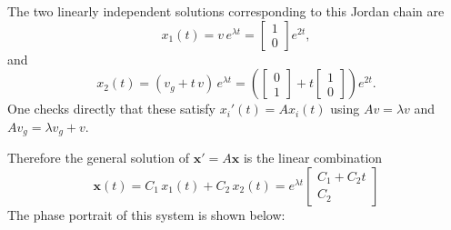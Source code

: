\documentclass[11pt]{article}
\begin{document}
The two linearly independent solutions corresponding to this Jordan chain are
\begin{equation}
x_1(t)=v\,e^{\lambda t} = \begin{bmatrix}1\\[4pt]0\end{bmatrix} e^{2t}, \label{eq:sol1}
\end{equation}
and
\begin{equation}
x_2(t)=(v_g + t\,v)\,e^{\lambda t} = \left(\begin{bmatrix}0\\[4pt]1\end{bmatrix} + t\begin{bmatrix}1\\[4pt]0\end{bmatrix}\right)e^{2t}. \label{eq:sol2}
\end{equation}
One checks directly that these satisfy \(x_i'(t)=Ax_i(t)\) using \(Av=\lambda v\) and \(Av_g=\lambda v_g + v\).

Therefore the general solution of \(\mathbf{x}'=A\mathbf{x}\) is the linear combination
\begin{equation}
\mathbf{x}(t)=C_1\,x_1(t) + C_2\,x_2(t)
= e^{\lambda t} \begin{bmatrix}
C_1 + C_2 t \\[4pt] C_2
\end{bmatrix}
\end{equation}
The phase portrait of this system is shown below:
\end{document}
